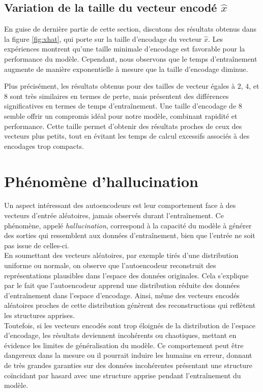 \documentclass{article}
\begin{document}
\subsection{Variation de la taille du vecteur encodé $\hat{x}$}
\noindent En guise de dernière partie de cette section, discutons des résultats obtenus dans la figure \ref{fig:xhat}, qui porte sur la taille d'encodage du vecteur $\hat{x}$. Les expériences montrent qu'une taille minimale d'encodage est favorable pour la performance du modèle. Cependant, nous observons que le temps d'entraînement augmente de manière exponentielle à mesure que la taille d'encodage diminue. 

\noindent Plus précisément, les résultats obtenus pour des tailles de vecteur égales à $2$, $4$, et $8$ sont très similaires en termes de perte, mais présentent des différences significatives en termes de temps d'entraînement. Une taille d'encodage de $8$ semble offrir un compromis idéal pour notre modèle, combinant rapidité et performance. Cette taille permet d'obtenir des résultats proches de ceux des vecteurs plus petits, tout en évitant les temps de calcul excessifs associés à des encodages trop compacts.


\section{Phénomène d'hallucination}

\noindent Un aspect intéressant des autoencodeurs est leur comportement face à des vecteurs d'entrée aléatoires, jamais observés durant l'entraînement. Ce phénomène, appelé \textit{hallucination}, correspond à la capacité du modèle à générer des sorties qui ressemblent aux données d'entraînement, bien que l'entrée ne soit pas issue de celles-ci. \\ 

\noindent En soumettant des vecteurs aléatoires, par exemple tirés d'une distribution uniforme ou normale, on observe que l'autoencodeur reconstruit des représentations plausibles dans l'espace des données originales. Cela s'explique par le fait que l'autoencodeur apprend une distribution réduite des données d'entraînement dans l'espace d'encodage. Ainsi, même des vecteurs encodés aléatoires proches de cette distribution génèrent des reconstructions qui reflètent les structures apprises. \\

\noindent Toutefois, si les vecteurs encodés sont trop éloignés de la distribution de l'espace d'encodage, les résultats deviennent incohérents ou chaotiques, mettant en évidence les limites de généralisation du modèle. Ce comportement peut être dangereux dans la mesure ou il pourrait induire les humains en erreur, donnant de très grandes garanties sur des données incohérentes présentant une structure coïncidant par hasard avec une structure apprise pendant l'entraînement du modèle.
\end{document}
